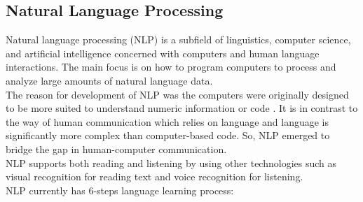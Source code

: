 \documentclass[12pt,oneside,openright,a4paper]{cpe-english-project}
\begin{document}
\subsection{Natural Language Processing}
Natural language processing (NLP) is a subfield of linguistics, computer science, and artificial
intelligence concerned with computers and human language interactions.
The main focus is on how to program computers to process and analyze large amounts of natural language data.\\
The reason for development of NLP was the computers were originally designed to be more suited
to understand numeric information or code \cite{nlp_technology}. It is in contrast to the way of human
communication which relies on language and language is significantly more complex than computer-based
code. So, NLP emerged to bridge the gap in human-computer communication.\\
NLP supports both reading and listening by using other technologies such as visual recognition for
reading text and voice recognition for listening.\\
NLP currently has 6-steps language learning process:
\end{document}
